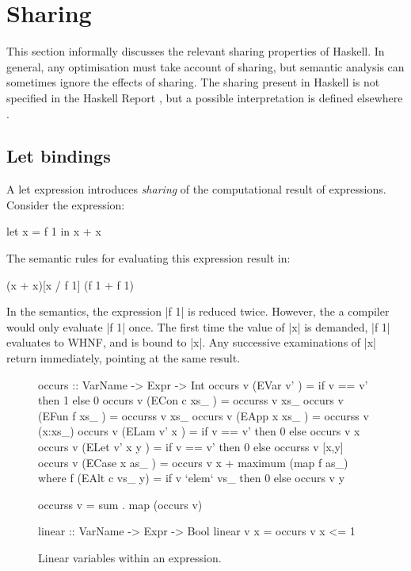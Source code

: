 \section{Sharing}
\label{secB:sharing}

This section informally discusses the relevant sharing properties of Haskell. In general, any optimisation must take account of sharing, but semantic analysis can sometimes ignore the effects of sharing. The sharing present in Haskell is not specified in the Haskell Report \cite{haskell}, but a possible interpretation is defined elsewhere \cite{bakewell:space_semantics}.

\subsection{Let bindings}

A let expression introduces \textit{sharing} of the computational result of expressions. Consider the expression:

\begin{example}
\ignore\begin{code}
let x = f 1
in x + x
\end{code}

The semantic rules for evaluating this expression result in:

\ignore\begin{code}
(x + x)[x / f 1]
(f 1 + f 1)
\end{code}

In the semantics, the expression |f 1| is reduced twice. However, the a compiler would only evaluate |f 1| once. The first time the value of |x| is demanded, |f 1| evaluates to WHNF, and is bound to |x|. Any successive examinations of |x| return immediately, pointing at the same result.
\end{example}


\begin{figure}
\begin{code}
occurs :: VarName -> Expr -> Int
occurs v (EVar v'      ) = if v == v' then 1 else 0
occurs v (ECon c xs_   ) = occurss v xs_
occurs v (EFun f xs_   ) = occurss v xs_
occurs v (EApp x xs_   ) = occurss v (x:xs_)
occurs v (ELam v' x    ) = if v == v' then 0 else occurs v x
occurs v (ELet v' x y  ) = if v == v' then 0 else occurss v [x,y]
occurs v (ECase x as_  ) = occurs v x + maximum (map f as_)
    where f (EAlt c vs_ y) = if v `elem` vs_ then 0 else occurs v y

occurss v = sum . map (occurs v)

linear :: VarName -> Expr -> Bool
linear v x = occurs v x <= 1
\end{code}
\caption{Linear variables within an expression.}
\label{figB:linear}
\end{figure}

